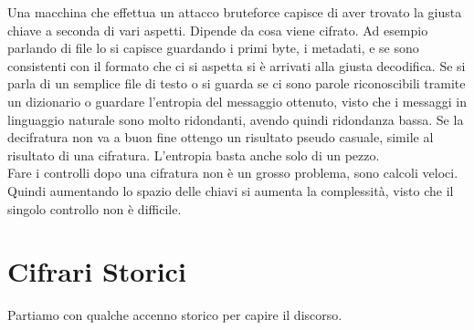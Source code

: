 \documentclass[a4paper,12pt, oneside]{book}
\begin{document}
Una macchina che effettua un attacco bruteforce capisce di aver trovato
la giusta chiave a seconda di vari aspetti. Dipende da cosa viene cifrato. Ad
esempio parlando di file lo si capisce guardando i primi byte, i metadati, e
se sono consistenti con il formato che ci si aspetta si è arrivati alla giusta
decodifica. Se si parla di un semplice file di testo o si guarda se ci sono
parole riconoscibili tramite un dizionario o guardare l'entropia del messaggio
ottenuto, visto che i messaggi in linguaggio naturale sono molto ridondanti,
avendo quindi ridondanza bassa. Se la decifratura non va a buon fine ottengo un
risultato pseudo casuale, simile al risultato di una cifratura. L'entropia basta
anche solo di un pezzo.\\
Fare i controlli dopo una cifratura non è un grosso problema, sono calcoli
veloci. Quindi aumentando lo spazio delle chiavi si aumenta la complessità,
visto che il singolo controllo non è difficile.
\section{Cifrari Storici}
Partiamo con qualche accenno storico per capire il discorso.
\end{document}
